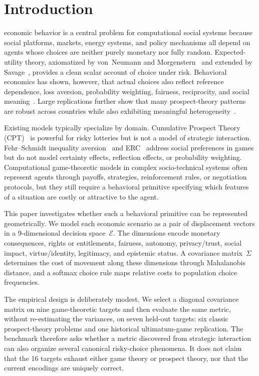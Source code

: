 \documentclass[journal]{IEEEtran}
\newcommand{\E}{\mathcal{E}}               %
\begin{document}
\section{Introduction}
\label{sec:intro}

 economic behavior is a central problem for computational social systems because social platforms, markets, energy systems, and policy mechanisms all depend on agents whose choices are neither purely monetary nor fully random.
Expected-utility theory, axiomatized by von~Neumann and Morgenstern~\cite{vonneumann1944} and extended by Savage~\cite{savage1954}, provides a clean scalar account of choice under risk.
Behavioral economics has shown, however, that actual choices also reflect reference dependence, loss aversion, probability weighting, fairness, reciprocity, and social meaning~\cite{kahneman1979,tversky1992,fehr1999,bolton2000}.
Large replications further show that many prospect-theory patterns are robust across countries while also exhibiting meaningful heterogeneity~\cite{ruggeri2020,henrich2010}.

Existing models typically specialize by domain.
Cumulative Prospect Theory (CPT)~\cite{tversky1992} is powerful for risky lotteries but is not a model of strategic interaction.
Fehr--Schmidt inequality aversion~\cite{fehr1999} and ERC~\cite{bolton2000} address social preferences in games but do not model certainty effects, reflection effects, or probability weighting.
Computational game-theoretic models in complex socio-technical systems often represent agents through payoffs, strategies, reinforcement rules, or negotiation protocols, but they still require a behavioral primitive specifying which features of a situation are costly or attractive to the agent.

This paper investigates whether such a behavioral primitive can be represented geometrically.
We model each economic scenario as a pair of displacement vectors in a 9-dimensional decision space~$\E$.
The dimensions encode monetary consequences, rights or entitlements, fairness, autonomy, privacy/trust, social impact, virtue/identity, legitimacy, and epistemic status.
A covariance matrix~$\Sigma$ determines the cost of movement along these dimensions through Mahalanobis distance, and a softmax choice rule maps relative costs to population choice frequencies.

The empirical design is deliberately modest.
We select a diagonal covariance matrix on nine game-theoretic targets and then evaluate the same metric, without re-estimating the variances, on seven held-out targets: six classic prospect-theory problems and one historical ultimatum-game replication.
The benchmark therefore asks whether a metric discovered from strategic interaction can also organize several canonical risky-choice phenomena.
It does not claim that the 16 targets exhaust either game theory or prospect theory, nor that the current encodings are uniquely correct.
\end{document}
